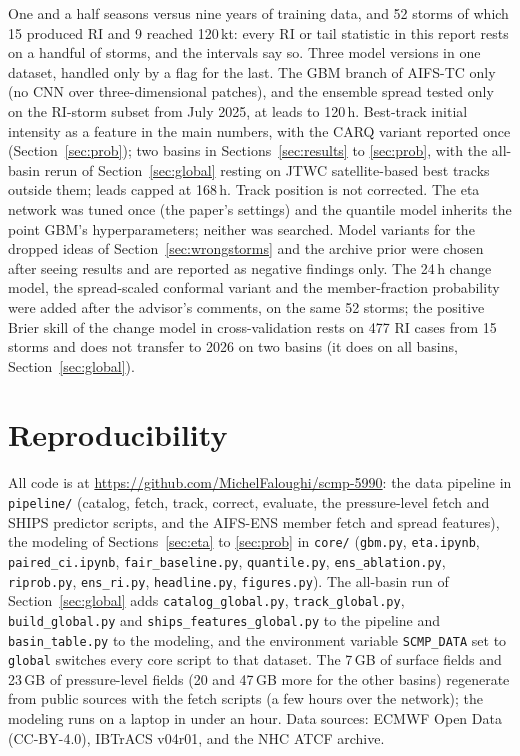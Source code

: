 \documentclass[11pt]{article}
\begin{document}
One and a half seasons versus nine years of training data, and 52 storms of which 15 produced RI
and 9 reached 120\,kt: every RI or tail statistic in this report rests on a handful of storms, and
the intervals say so. Three model versions in one dataset, handled only by a flag for the last. The GBM
branch of AIFS-TC only (no CNN over three-dimensional patches), and the ensemble spread tested
only on the RI-storm subset from July 2025, at leads to 120\,h.
Best-track initial intensity as a feature in the main numbers, with the CARQ variant reported
once (Section~\ref{sec:prob}); two basins in Sections~\ref{sec:results} to \ref{sec:prob},
with the all-basin rerun of Section~\ref{sec:global} resting on JTWC satellite-based best tracks
outside them; leads capped at 168\,h.
Track position is not corrected. The eta network was tuned once (the paper's
settings) and the quantile model inherits the point GBM's hyperparameters; neither was searched.
Model variants for the dropped ideas of Section~\ref{sec:wrongstorms} and the archive prior were
chosen after seeing results and are reported as negative findings only. The 24\,h change model,
the spread-scaled conformal variant and the member-fraction probability were added after the
advisor's comments, on the same 52 storms; the positive Brier skill of the change model in
cross-validation rests on 477 RI cases from 15 storms and does not transfer to 2026 on two
basins (it does on all basins, Section~\ref{sec:global}).

\FloatBarrier
\section{Reproducibility}

\begin{sloppypar}
All code is at \url{https://github.com/MichelFaloughi/scmp-5990}: the data pipeline in
\texttt{pipeline/} (catalog, fetch, track, correct, evaluate, the pressure-level fetch and
SHIPS predictor scripts, and the AIFS-ENS member fetch and spread features), the modeling of Sections~\ref{sec:eta} to \ref{sec:prob} in
\texttt{core/} (\texttt{gbm.py}, \texttt{eta.ipynb}, \texttt{paired\_ci.ipynb},
\texttt{fair\_baseline.py}, \texttt{quantile.py}, \texttt{ens\_ablation.py}, \texttt{riprob.py},
\texttt{ens\_ri.py}, \texttt{headline.py}, \texttt{figures.py}). The all-basin run of
Section~\ref{sec:global} adds \texttt{catalog\_global.py}, \texttt{track\_global.py},
\texttt{build\_global.py} and \texttt{ships\_features\_global.py} to the pipeline and
\texttt{basin\_table.py} to the modeling, and the environment variable \texttt{SCMP\_DATA} set
to \texttt{global} switches every core script to that dataset. The 7\,GB of surface
fields and 23\,GB of pressure-level fields (20 and 47\,GB more for the other basins) regenerate from public sources with the fetch
scripts (a few hours over the network); the modeling runs on a laptop in under an hour. Data sources: ECMWF Open Data
(CC-BY-4.0), IBTrACS v04r01, and the NHC ATCF archive.
\end{sloppypar}



\end{document}
